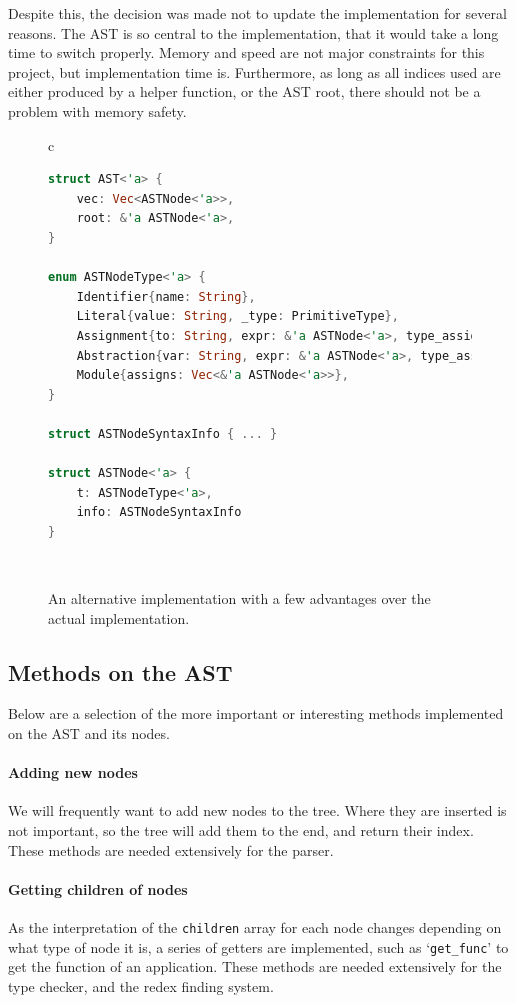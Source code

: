 Despite this, the decision was made not to update the implementation for several reasons. The \ac{AST} is so central to the implementation, that it would take a long time to switch properly. Memory and speed are not major constraints for this project, but implementation time is. Furthermore, as long as all indices used are either produced by a helper function, or the \ac{AST} root, there should not be a problem with memory safety. 

\begin{figure}[t]
    \centering
    \begin{tabular}{c}
        \hline
    \begin{lstlisting}[language=Rust]
struct AST<'a> {
    vec: Vec<ASTNode<'a>>,
    root: &'a ASTNode<'a>,
}

enum ASTNodeType<'a> {
    Identifier{name: String},
    Literal{value: String, _type: PrimitiveType},
    Assignment{to: String, expr: &'a ASTNode<'a>, type_assign: Type},
    Abstraction{var: String, expr: &'a ASTNode<'a>, type_assign: Type},
    Module{assigns: Vec<&'a ASTNode<'a>>},
} 

struct ASTNodeSyntaxInfo { ... }

struct ASTNode<'a> {
    t: ASTNodeType<'a>,
    info: ASTNodeSyntaxInfo
}
    \end{lstlisting}
    \\\hline
    \end{tabular}
    \caption{An alternative implementation with a few advantages over the actual implementation. }
    \label{fig:ast_lst_2}
\end{figure}

\subsection{Methods on the AST}
Below are a selection of the more important or interesting methods implemented on the \ac{AST} and its nodes. 

\paragraph{Adding new nodes} We will frequently want to add new nodes to the tree. Where they are inserted is not important, so the tree will add them to the end, and return their index. These methods are needed extensively for the parser.

\paragraph{Getting children of nodes} As the interpretation of the \verb|children| array for each node changes depending on what type of node it is, a series of getters are implemented, such as `\verb|get_func|' to get the function of an application. These methods are needed extensively for the type checker, and the redex finding system. 

